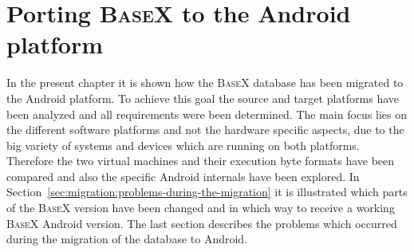 \chapter{Porting \textsc{BaseX} to the Android platform}
\label{sec:migration:porting-basex-to-android}
In the present chapter it is shown how the \textsc{BaseX} database has been migrated to the Android platform.
To achieve this goal the source and target platforms have been analyzed and all requirements were been determined.
The main focus lies on the different software platforms and not the hardware specific aspects, due to the big variety of systems and devices which are running on both platforms. 
Therefore the two virtual machines and their execution byte formats have been compared and also the specific Android internals have been explored.
In Section~\ref{sec:migration:problems-during-the-migration} it is illustrated which parts of the \textsc{BaseX} version have been changed and in which way to receive a working \textsc{BaseX} Android version.
The last section describes the problems which occurred during the migration of the database to Android.

